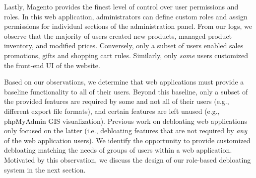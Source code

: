 Lastly, Magento provides the finest level of control over user permissions and roles. 
In this web application, administrators can define custom roles and assign permissions for individual sections of the administration panel. 
From our logs, we observe that the majority of users created new products, managed product inventory, and modified prices. 
Conversely, only a subset of users enabled sales promotions, gifts and shopping cart rules. 
Similarly, only \emph{some} users customized the front-end UI of the website.

Based on our observations, we determine that web applications must provide a baseline functionality to all of their users. 
Beyond this baseline, only a subset of the provided features are required by some and not all of their users (e.g., different export file formats), and certain features are left unused (e.g., phpMyAdmin GIS visualization). 
Previous work on debloating web applications only focused on the latter (i.e., debloating features that are not required by \emph{any} of the web application users). 
We identify the opportunity to provide customized debloating matching the needs of groups of users within a web application. 
Motivated by this observation, we discuss the design of our role-based debloating system in the next section. 
